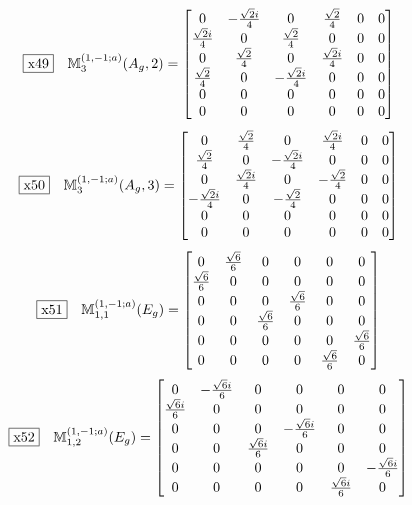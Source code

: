 \documentclass[fleqn,10pt,landscape]{jsarticle}
\begin{document}
\begin{dmath*}
\fbox{x49}\quad \mathbb{M}_{3}^{(1,-1;a)}(A_{g},2)=\begin{bmatrix} 0 & - \frac{\sqrt{2} i}{4} & 0 & \frac{\sqrt{2}}{4} & 0 & 0 \\ \frac{\sqrt{2} i}{4} & 0 & \frac{\sqrt{2}}{4} & 0 & 0 & 0 \\ 0 & \frac{\sqrt{2}}{4} & 0 & \frac{\sqrt{2} i}{4} & 0 & 0 \\ \frac{\sqrt{2}}{4} & 0 & - \frac{\sqrt{2} i}{4} & 0 & 0 & 0 \\ 0 & 0 & 0 & 0 & 0 & 0 \\ 0 & 0 & 0 & 0 & 0 & 0 \end{bmatrix}
\end{dmath*}
\begin{dmath*}
\fbox{x50}\quad \mathbb{M}_{3}^{(1,-1;a)}(A_{g},3)=\begin{bmatrix} 0 & \frac{\sqrt{2}}{4} & 0 & \frac{\sqrt{2} i}{4} & 0 & 0 \\ \frac{\sqrt{2}}{4} & 0 & - \frac{\sqrt{2} i}{4} & 0 & 0 & 0 \\ 0 & \frac{\sqrt{2} i}{4} & 0 & - \frac{\sqrt{2}}{4} & 0 & 0 \\ - \frac{\sqrt{2} i}{4} & 0 & - \frac{\sqrt{2}}{4} & 0 & 0 & 0 \\ 0 & 0 & 0 & 0 & 0 & 0 \\ 0 & 0 & 0 & 0 & 0 & 0 \end{bmatrix}
\end{dmath*}
\begin{dmath*}
\fbox{x51}\quad \mathbb{M}_{1,1}^{(1,-1;a)}(E_{g})=\begin{bmatrix} 0 & \frac{\sqrt{6}}{6} & 0 & 0 & 0 & 0 \\ \frac{\sqrt{6}}{6} & 0 & 0 & 0 & 0 & 0 \\ 0 & 0 & 0 & \frac{\sqrt{6}}{6} & 0 & 0 \\ 0 & 0 & \frac{\sqrt{6}}{6} & 0 & 0 & 0 \\ 0 & 0 & 0 & 0 & 0 & \frac{\sqrt{6}}{6} \\ 0 & 0 & 0 & 0 & \frac{\sqrt{6}}{6} & 0 \end{bmatrix}
\end{dmath*}
\begin{dmath*}
\fbox{x52}\quad \mathbb{M}_{1,2}^{(1,-1;a)}(E_{g})=\begin{bmatrix} 0 & - \frac{\sqrt{6} i}{6} & 0 & 0 & 0 & 0 \\ \frac{\sqrt{6} i}{6} & 0 & 0 & 0 & 0 & 0 \\ 0 & 0 & 0 & - \frac{\sqrt{6} i}{6} & 0 & 0 \\ 0 & 0 & \frac{\sqrt{6} i}{6} & 0 & 0 & 0 \\ 0 & 0 & 0 & 0 & 0 & - \frac{\sqrt{6} i}{6} \\ 0 & 0 & 0 & 0 & \frac{\sqrt{6} i}{6} & 0 \end{bmatrix}
\end{dmath*}
\end{document}
